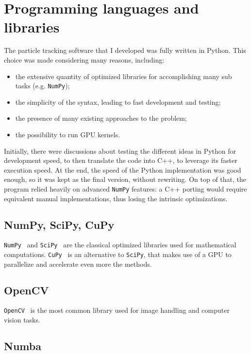 \section{Programming languages and libraries}

The particle tracking software that I developed was fully written in Python.
This choice was made considering many reasons, including:
\begin{itemize}
	\itemsep 0em
	\item the extensive quantity of optimized libraries for accomplishing many sub tasks (e.g. \texttt{NumPy});
	\item the simplicity of the syntax, leading to fast development and testing;
	\item the presence of many existing approaches to the problem;
	\item the possibility to run GPU kernels.
\end{itemize}
Initially, there were discussions about testing the different ideas in Python for development speed, to then translate the code into C++, to leverage its faster execution speed.
At the end, the speed of the Python implementation was good enough, so it was kept as the final version, without rewriting.
On top of that, the program relied heavily on advanced \texttt{NumPy} features: a C++ porting would require equivalent manual implementations, thus losing the intrinsic optimizations.

\subsection{NumPy, SciPy, CuPy}

\texttt{NumPy}~\cite{numpy} and \texttt{SciPy}~\cite{scipy} are the classical optimized libraries used for mathematical computations.
\texttt{CuPy}~\cite{cupy} is an alternative to \texttt{SciPy}, that makes use of a GPU to parallelize and accelerate even more the methods.

\subsection{OpenCV}

\texttt{OpenCV}~\cite{opencv} is the most common library used for image handling and computer vision tasks.

\subsection{Numba}

